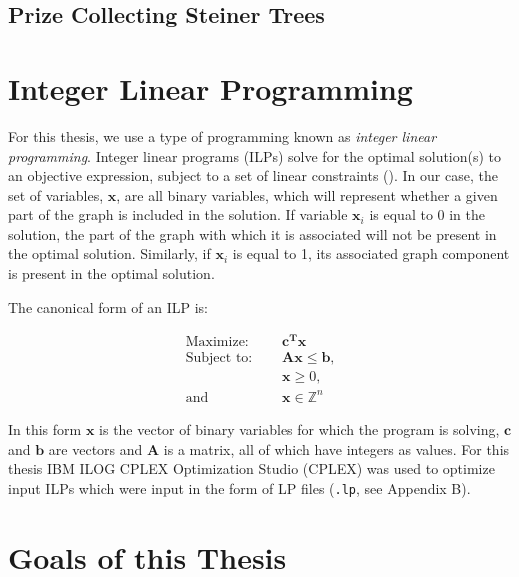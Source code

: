 \documentclass[12pt,twoside]{reedthesis}
\theoremstyle{definition}
\begin{document}
  \subsection{Prize Collecting Steiner Trees}

 \section{Integer Linear Programming}

  For this thesis, we use a type of programming known as \textit{integer linear programming}. Integer linear programs (ILPs) solve for the optimal solution(s) to an objective expression, subject to a set of linear constraints (\cite{Papadimitriou1998}). In our case, the set of variables, $\mathbf{x}$, are all binary variables, which will represent whether a given part of the graph is included in the solution. If variable $\mathbf{x}_i$ is equal to 0 in the solution, the part of the graph with which it is associated will not be present in the optimal solution. Similarly, if $\mathbf{x}_i$ is equal to 1, its associated graph component is present in the optimal solution.\par

  The canonical form of an ILP is:\par

  \begin{align}
    \text{Maximize: }\quad&\mathbf{c^Tx}\label{eq:obj_canonical}\\
    \text{Subject to: }\quad&\mathbf{Ax}\leq\mathbf{b}\text{,}\label{eq:constA}\\
    &\mathbf{x} \geq 0 \text{,}\label{eq:constB}\\
    \text{and } \quad & \mathbf{x} \in \mathbb{Z}^n \label{eq:constC}
  \end{align}

  In this form $\mathbf{x}$ is the vector of binary variables for which the program is solving, $\mathbf{c}$ and $\mathbf{b}$ are vectors and $\mathbf{A}$ is a matrix, all of which have integers as values. For this thesis IBM ILOG CPLEX Optimization Studio (CPLEX) was used to optimize input ILPs which were input in the form of LP files (\texttt{.lp}, see Appendix B).

 \section{Goals of this Thesis}
\end{document}

